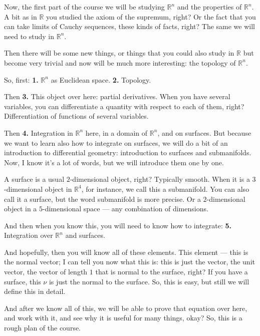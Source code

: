 \begin{spoken-clean}[00:21:00 - 00:23:23]
Now, the first part of the course we will be studying $\mathbb{R}^n$ and the properties of $\mathbb{R}^n$. A bit as in $\mathbb{R}$ you studied the axiom of the supremum, right? Or the fact that you can take limits of Cauchy sequences, these kinds of facts, right? The same we will need to study in $\mathbb{R}^n$.

Then there will be some new things, or things that you could also study in $\mathbb{R}$ but become very trivial and now will be much more interesting: the topology of $\mathbb{R}^n$.

So, first: \textbf{1.} $\mathbb{R}^n$ as Euclidean space. \textbf{2.} Topology.

Then \textbf{3.} This object over here: partial derivatives. When you have several variables, you can differentiate a quantity with respect to each of them, right? Differentiation of functions of several variables.

Then \textbf{4.} Integration in $\mathbb{R}^n$ here, in a domain of $\mathbb{R}^n$, and on surfaces. But because we want to learn also how to integrate on surfaces, we will do a bit of an introduction to differential geometry: introduction to surfaces and submanifolds. Now, I know it's a lot of words, but we will introduce them one by one.

A surface is a usual $2$-dimensional object, right? Typically smooth. When it is a $3$-dimensional object in $\mathbb{R}^4$, for instance, we call this a submanifold. You can also call it a surface, but the word submanifold is more precise. Or a $2$-dimensional object in a $5$-dimensional space --- any combination of dimensions.

And then when you know this, you will need to know how to integrate: \textbf{5.} Integration over $\mathbb{R}^n$ and surfaces.

And hopefully, then you will know all of these elements. This element --- this is the normal vector; I can tell you now what this is: this is just the vector, the unit vector, the vector of length $1$ that is normal to the surface, right? If you have a surface, this $\nu$ is just the normal to the surface. So, this is easy, but still we will define this in detail.

And after we know all of this, we will be able to prove that equation over here, and work with it, and see why it is useful for many things, okay? So, this is a rough plan of the course.
\end{spoken-clean}

